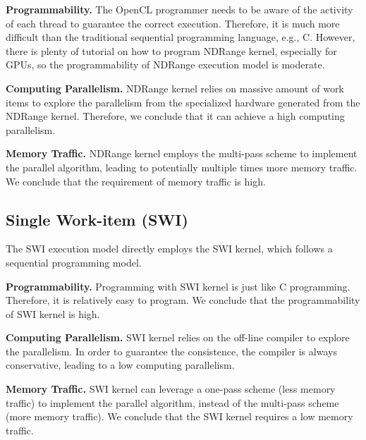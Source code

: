 {\bf Programmability. }The OpenCL programmer needs to be aware of the activity of each thread to guarantee the correct execution. Therefore, it is much more difficult than the traditional sequential programming language, e.g., C. However, there is plenty of tutorial on how to program NDRange kernel, especially for GPUs, so the programmability of NDRange execution model is moderate.

{\bf Computing Parallelism. }NDRange kernel relies on massive amount of work items to explore the parallelism from the specialized hardware generated from the NDRange kernel. Therefore, we conclude that it can achieve a high computing parallelism.  

{\bf Memory Traffic. }NDRange kernel employs the multi-pass scheme to implement the parallel algorithm, leading to potentially multiple times more memory traffic. We conclude that the requirement of memory traffic is high. 

\vspace{-1ex}
\subsection{Single Work-item (SWI)}
\label{subsec_swi} 
The SWI execution model directly employs the SWI kernel, which follows a sequential programming model. %


{\bf Programmability. }Programming with SWI kernel is just like C programming. Therefore, it is relatively easy to program. We conclude that the programmability of SWI kernel is high.

{\bf Computing Parallelism. }SWI kernel relies on the off-line compiler to explore the parallelism. In order to guarantee the consistence, the compiler is always conservative, leading to a low computing parallelism.  

{\bf Memory Traffic. }SWI kernel can leverage a one-pass scheme (less memory traffic) to implement the parallel algorithm, instead of the multi-pass scheme (more memory traffic). We conclude that the SWI kernel requires a low memory traffic. 

